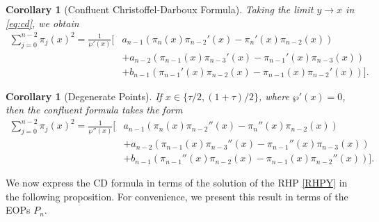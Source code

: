 \documentclass[11pt,a4paper]{article}
\newtheorem{corollary}[theorem]{Corollary}
\theoremstyle{definition}
\numberwithin{equation}{section}
\numberwithin{theorem}{section}
\begin{document}
\begin{corollary}[Confluent Christoffel-Darboux Formula]
Taking the limit \( y \to x \) in \eqref{eq:cd}, we obtain
\begin{equation}
\begin{aligned}
\sum_{j=0}^{n-2} \pi_j(x)^2 = \frac{1}{\wp'(x)} \bigg[ &a_{n-1} \left( \pi_n(x)\pi_{n-2}'(x) - \pi_n'(x)\pi_{n-2}(x) \right) \\
&+ a_{n-2} \left( \pi_{n-1}(x)\pi_{n-3}'(x) - \pi_{n-1}'(x)\pi_{n-3}(x) \right) \\
&+ b_{n-1} \left( \pi_{n-1}'(x)\pi_{n-2}(x) - \pi_{n-1}(x)\pi_{n-2}'(x) \right) \bigg].
\end{aligned}
\end{equation}
\end{corollary}

\begin{corollary}[Degenerate Points]
If \( x \in \{\tau/2, (1+\tau)/2\} \), where \( \wp'(x) = 0 \), then the confluent formula takes the form
\begin{equation}
\begin{aligned}
\sum_{j=0}^{n-2} \pi_j(x)^2 = \frac{1}{\wp''(x)} \bigg[ &a_{n-1} \left( \pi_n(x)\pi_{n-2}''(x) - \pi_n''(x)\pi_{n-2}(x) \right) \\
&+ a_{n-2} \left( \pi_{n-1}(x)\pi_{n-3}''(x) - \pi_{n-1}''(x)\pi_{n-3}(x) \right) \\
&+ b_{n-1} \left( \pi_{n-1}''(x)\pi_{n-2}(x) - \pi_{n-1}(x)\pi_{n-2}''(x) \right) \bigg].
\end{aligned}
\end{equation}
\end{corollary}
We now express the CD formula in terms of the solution of the RHP \ref{RHPY} in the following proposition. For convenience, we present this result in terms of the EOPs $P_n$.
\end{document}
